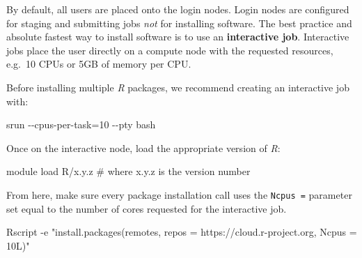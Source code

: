 \documentclass[
  letterpaper,
  DIV=11,
  numbers=noendperiod]{scrreport}
\newenvironment{Shaded}{\begin{snugshade}}{\end{snugshade}}
\newcommand{\AttributeTok}[1]{\textcolor[rgb]{0.40,0.45,0.13}{#1}}
\newcommand{\CommentTok}[1]{\textcolor[rgb]{0.37,0.37,0.37}{#1}}
\newcommand{\ExtensionTok}[1]{\textcolor[rgb]{0.00,0.23,0.31}{#1}}
\newcommand{\NormalTok}[1]{\textcolor[rgb]{0.00,0.23,0.31}{#1}}
\newcommand{\OperatorTok}[1]{\textcolor[rgb]{0.37,0.37,0.37}{#1}}
\newcommand{\SpecialCharTok}[1]{\textcolor[rgb]{0.37,0.37,0.37}{#1}}
\newcommand{\StringTok}[1]{\textcolor[rgb]{0.13,0.47,0.30}{#1}}
\begin{document}
By default, all users are placed onto the login nodes. Login nodes are
configured for staging and submitting jobs \emph{not} for installing
software. The best practice and absolute fastest way to install software
is to use an \textbf{interactive job}. Interactive jobs place the user
directly on a compute node with the requested resources, e.g.~10 CPUs or
5GB of memory per CPU.

Before installing multiple \emph{R} packages, we recommend creating an
interactive job with:

\begin{Shaded}
\begin{Highlighting}[]
\ExtensionTok{srun} \AttributeTok{{-}{-}cpus{-}per{-}task}\OperatorTok{=}\NormalTok{10 }\AttributeTok{{-}{-}pty}\NormalTok{ bash}
\end{Highlighting}
\end{Shaded}

Once on the interactive node, load the appropriate version of \emph{R}:

\begin{Shaded}
\begin{Highlighting}[]
\NormalTok{module load R}\SpecialCharTok{/}\NormalTok{x.y.z }\CommentTok{\# where x.y.z is the version number}
\end{Highlighting}
\end{Shaded}

From here, make sure every package installation call uses the
\texttt{Ncpus\ =} parameter set equal to the number of cores requested
for the interactive job.

\begin{Shaded}
\begin{Highlighting}[]
\NormalTok{Rscript }\SpecialCharTok{{-}}\NormalTok{e }\StringTok{"install.packages(\textquotesingle{}remotes\textquotesingle{}, repos = \textquotesingle{}https://cloud.r{-}project.org\textquotesingle{}, Ncpus = 10L)"}
\end{Highlighting}
\end{Shaded}
\end{document}
